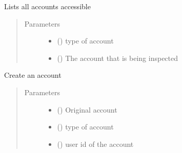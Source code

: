 \documentclass[letterpaper,10pt,english]{sphinxmanual}
\begin{document}

\begin{fulllineitems}
\label{\detokenize{sample:sample.terminalFunctions.ls}}
Lists all accounts accessible
\begin{quote}\begin{description}
\item[{Parameters}] \leavevmode\begin{itemize}
\item {} 
 () \textendash{} type of account

\item {} 
 ({\hyperref[\detokenize{sample:sample.customer.Customer}]{}}) \textendash{} The account that is being inspected

\end{itemize}

\end{description}\end{quote}

\end{fulllineitems}


\begin{fulllineitems}
\label{\detokenize{sample:sample.terminalFunctions.make}}
Create an account
\begin{quote}\begin{description}
\item[{Parameters}] \leavevmode\begin{itemize}
\item {} 
 ({\hyperref[\detokenize{sample:sample.customer.Customer}]{}}) \textendash{} Original account

\item {} 
 () \textendash{} type of account

\item {} 
 () \textendash{} user id of the account

\end{itemize}

\end{description}\end{quote}

\end{fulllineitems}
\end{document}
